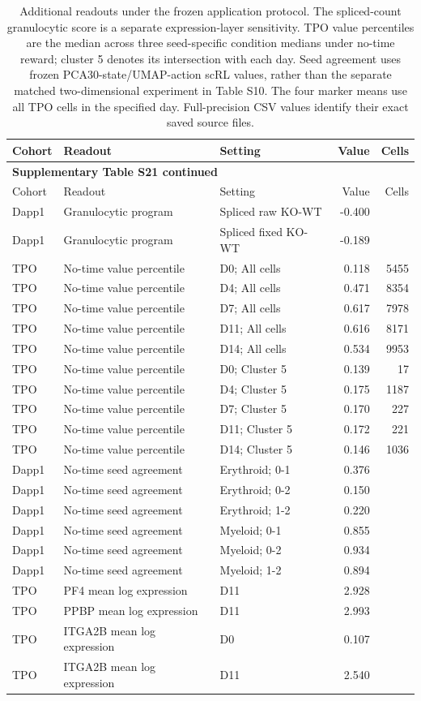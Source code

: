 \small
\setlength{\tabcolsep}{4pt}
\begin{longtable}{@{}lp{4.0cm}p{4.1cm}rr@{}}
\caption{Additional readouts under the frozen application protocol. The spliced-count granulocytic score is a separate expression-layer sensitivity. TPO value percentiles are the median across three seed-specific condition medians under no-time reward; cluster 5 denotes its intersection with each day. Seed agreement uses frozen PCA30-state/UMAP-action scRL values, rather than the separate matched two-dimensional experiment in Table S10. The four marker means use all TPO cells in the specified day. Full-precision CSV values identify their exact saved source files.}\label{tab:s21}\\
\toprule Cohort & Readout & Setting & Value & Cells\\\midrule\endfirsthead
\multicolumn{5}{l}{\textbf{Supplementary Table S21 continued}}\\
\toprule Cohort & Readout & Setting & Value & Cells\\\midrule\endhead
\bottomrule\endfoot
Dapp1 & Granulocytic program & Spliced raw KO-WT & -0.400 & \\
Dapp1 & Granulocytic program & Spliced fixed KO-WT & -0.189 & \\
TPO & No-time value percentile & D0; All cells & 0.118 & 5455\\
TPO & No-time value percentile & D4; All cells & 0.471 & 8354\\
TPO & No-time value percentile & D7; All cells & 0.617 & 7978\\
TPO & No-time value percentile & D11; All cells & 0.616 & 8171\\
TPO & No-time value percentile & D14; All cells & 0.534 & 9953\\
TPO & No-time value percentile & D0; Cluster 5 & 0.139 & 17\\
TPO & No-time value percentile & D4; Cluster 5 & 0.175 & 1187\\
TPO & No-time value percentile & D7; Cluster 5 & 0.170 & 227\\
TPO & No-time value percentile & D11; Cluster 5 & 0.172 & 221\\
TPO & No-time value percentile & D14; Cluster 5 & 0.146 & 1036\\
Dapp1 & No-time seed agreement & Erythroid; 0-1 & 0.376 & \\
Dapp1 & No-time seed agreement & Erythroid; 0-2 & 0.150 & \\
Dapp1 & No-time seed agreement & Erythroid; 1-2 & 0.220 & \\
Dapp1 & No-time seed agreement & Myeloid; 0-1 & 0.855 & \\
Dapp1 & No-time seed agreement & Myeloid; 0-2 & 0.934 & \\
Dapp1 & No-time seed agreement & Myeloid; 1-2 & 0.894 & \\
TPO & PF4 mean log expression & D11 & 2.928 & \\
TPO & PPBP mean log expression & D11 & 2.993 & \\
TPO & ITGA2B mean log expression & D0 & 0.107 & \\
TPO & ITGA2B mean log expression & D11 & 2.540 & \\
\end{longtable}
\normalsize
